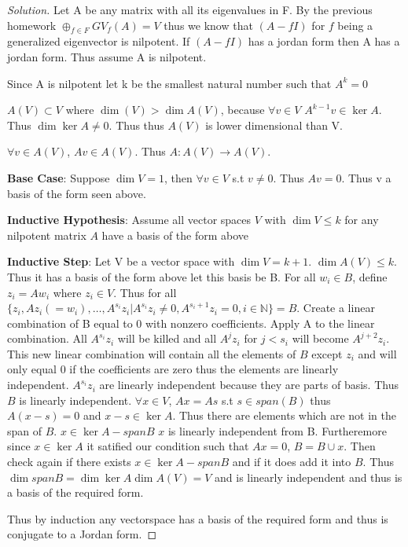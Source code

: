 \documentclass{article}
\newcommand{\N}{\mathbb{N}}
\newenvironment{solution}
{\renewcommand\qedsymbol{$\blacksquare$}\begin{proof}[Solution]}
{\end{proof}}
\begin{document}
\begin{solution}
    Let A be any matrix with all its eigenvalues in F. By the previous homework $\oplus_{f \in F}GV_f(A) = V$ thus we know that $(A - fI)$ for $f$ being a generalized eigenvector is nilpotent. If $(A - fI)$ has a jordan form then A has a jordan form. Thus assume A is nilpotent.

    Since A is nilpotent let k be the smallest natural number such that $A^k = 0$

    $A(V) \subset V$ where $\dim(V) > \dim A(V)$, because $\forall v \in V$ $A^{k-1}v \in \ker A$. Thus $\dim \ker A \neq 0 $. Thus thus $A(V)$ is lower dimensional than V.
    
    $\forall v \in A(V)$, $Av \in A(V)$. Thus $A: A(V) \to A(V)$. 
    
    \textbf{Base Case}: Suppose $\dim V = 1$, then $\forall v \in V$ s.t $v \neq 0$. Thus $Av = 0$. Thus v a basis of the form seen above.

    \textbf{Inductive Hypothesis}: Assume all vector spaces $V$ with $\dim V \leq k$ for any nilpotent matrix $A$ have a basis of the form above

    \textbf{Inductive Step}: Let V be a vector space with $\dim V = k + 1$. $\dim A(V) \leq k$. Thus it has a basis of the form above let this basis be B. For all $w_i \in B$, define $z_i = Aw_i$ where $z_i \in V$. Thus for all $\{z_i, Az_i(=w_i), \ldots, A^{s_i}z_i | A^{s_i}z_i \neq 0, A^{s_i + 1}z_i = 0, i \in \N\} = B$. Create a linear combination of B equal to 0 with nonzero coefficients. Apply A to the linear combination. All $A^{s_i}z_i$ will be killed and all $A^{j}z_i$ for $j < s_i$ will become $A^{j + 2}z_i$. This new linear combination will contain all the elements of $B$ except $z_i$ and will only equal 0 if the coefficients are zero thus the elements are linearly independent. $A^{s_i}z_i$ are linearly independent because they are parts of basis. Thus $B$ is linearly independent. $\forall x \in V$, $Ax = As$ s.t $s \in span(B)$ thus $A(x - s) = 0$ and $x - s \in \ker A$. Thus there are elements which are not in the span of $B$. $x \in \ker A - span B$ $x$ is linearly independent from B. Furtheremore since $x \in \ker A$ it satified our condition such that $Ax = 0$, $B = B \cup x$. Then check again if there exists $x \in \ker A - span B$ and if it does add it into $B$. Thus $\dim span B = \dim \ker A \dim A(V) = V$ and is linearly independent and thus is a basis of the required form.


    Thus by induction any vectorspace has a basis of the required form and thus is conjugate to a Jordan form.
\end{solution}
\end{document}
